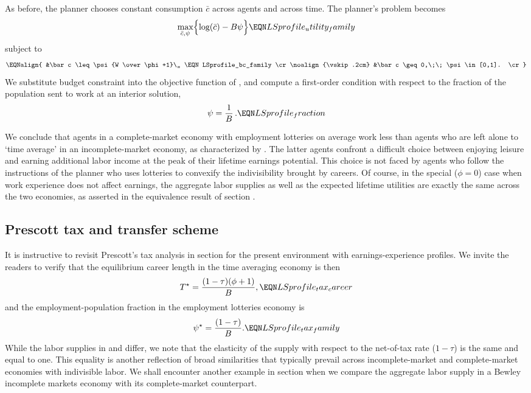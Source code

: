 As before, the planner chooses constant consumption $\bar c$
across agents and across time. The planner's problem becomes
$$
\max_{\bar c, \psi} \Bigl\{ \log(\bar c) - B \psi \Bigr\}
                                            \EQN LSprofile_utility_family
$$
subject to
$$\EQNalign{
&\bar c \leq \psi {W \over \phi+1}\,,        \EQN LSprofile_bc_family   \cr
\noalign{\vskip.2cm}
&\bar c \geq 0,\;\; \psi\in[0,1].  \cr}
$$
We substitute budget constraint  into the
objective function of , and
compute a first-order condition with respect to the fraction of the
population sent to work at an interior solution,
$$
\psi = {1 \over B}\,.                         \EQN LSprofile_fraction
$$

We conclude that agents in a complete-market economy with employment
lotteries on average work less than agents who are left alone to `time average'
in an  incomplete-market economy, as characterized by .
The latter agents confront a difficult choice between enjoying leisure
and earning additional labor income at the peak of their lifetime
earnings potential. This choice is not faced by  agents who
follow the instructions of the planner who uses lotteries to convexify
the indivisibility brought by careers. Of course, in the special
($\phi=0$) case when work experience does not affect earnings, the
aggregate labor supplies as well as the expected lifetime utilities
are exactly the same across the two economies, as asserted in the equivalence
result of section .



\subsection{Prescott tax and transfer scheme}

It is instructive to revisit Prescott's tax analysis in
section  for the present environment with
earnings-experience profiles. We invite the readers to verify
that the equilibrium career length in the time averaging
economy is then
$$
T^{\star} = {(1-\tau) (\phi +1) \over B },   \EQN LSprofile_tax_career
$$
and the employment-population fraction in the employment
lotteries economy is
$$
\psi^{\star} = {(1-\tau) \over B }.          \EQN LSprofile_tax_family
$$
While the labor supplies in  and
 differ, we note that the elasticity of
the supply with respect to the net-of-tax rate ($1-\tau$) is the
same and equal to one. This equality is another  reflection of  broad
similarities that typically prevail across incomplete-market and complete-market economies
with indivisible labor.  We shall encounter  another example  in section  when we compare the
aggregate labor supply  in a Bewley  incomplete markets
economy with its complete-market counterpart.
%

